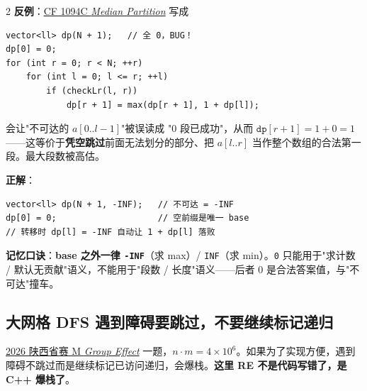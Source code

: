 \begin{multicols*}{2}
		\textbf{反例}：\href{https://vjudge.net/problem/CodeForces-2222C}{CF 1094C \emph{Median Partition}} 写成
		\begin{verbatim}
vector<ll> dp(N + 1);   // 全 0，BUG！
dp[0] = 0;
for (int r = 0; r < N; ++r)
    for (int l = 0; l <= r; ++l)
        if (checkLr(l, r))
            dp[r + 1] = max(dp[r + 1], 1 + dp[l]);
		\end{verbatim}
		会让"不可达的 $a[0..l{-}1]$"被误读成 "0 段已成功"，从而 $\texttt{dp}[r{+}1] = 1 + 0 = 1$ ——这等价于\textbf{凭空跳过}前面无法划分的部分、把 $a[l..r]$ 当作整个数组的合法第一段。最大段数被高估。

		\textbf{正解}：
		\begin{verbatim}
vector<ll> dp(N + 1, -INF);   // 不可达 = -INF
dp[0] = 0;                    // 空前缀是唯一 base
// 转移时 dp[l] = -INF 自动让 1 + dp[l] 落败
		\end{verbatim}

		\textbf{记忆口诀}：\textbf{base 之外一律 \texttt{-INF}}（求 max）/ \texttt{INF}（求 min）。\texttt{0} 只能用于"求计数 / 默认无贡献"语义，不能用于"段数 / 长度"语义——后者 0 是合法答案值，与"不可达"撞车。

		\subsection{大网格 DFS 遇到障碍要跳过，不要继续标记递归}

		\href{https://vjudge.net/problem/CodeForces-106532M}{2026 陕西省赛 M \emph{Group Effect}} 一题，$n \cdot m = 4 \times 10^6$。如果为了实现方便，遇到障碍不跳过而是继续标记已访问递归，会爆栈。\textbf{这里 RE 不是代码写错了，是 C++ 爆栈了}。

	\end{multicols*}

